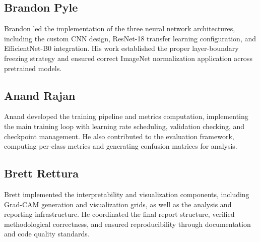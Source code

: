 \documentclass[conference]{IEEEtran}
\begin{document}
\subsection*{Brandon Pyle}
Brandon led the implementation of the three neural network architectures,
including the custom CNN design, ResNet-18 transfer learning configuration, and
EfficientNet-B0 integration. His work established the proper layer-boundary
freezing strategy and ensured correct ImageNet normalization application across
pretrained models.

\subsection*{Anand Rajan}
Anand developed the training pipeline and metrics computation, implementing
the main training loop with learning rate scheduling, validation checking, and
checkpoint management. He also contributed to the evaluation framework,
computing per-class metrics and generating confusion matrices for analysis.

\subsection*{Brett Rettura}
Brett implemented the interpretability and visualization components, including
Grad-CAM generation and visualization grids, as well as the analysis and
reporting infrastructure. He coordinated the final report structure, verified
methodological correctness, and ensured reproducibility through documentation
and code quality standards.
\end{document}
